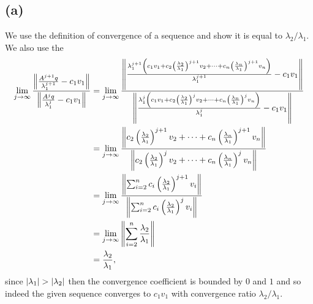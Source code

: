 \documentclass[12pt]{article}
\begin{document}
		\subsection*{(a)}
			We use the definition of convergence of a sequence and show it is equal to $\lambda_2 / \lambda_1$. We also use the 
			\begin{align*}
				\lim_{j \to \infty} \frac{\norm{\frac{A^{j+1}q}{\lambda_{1}^{j+1}} - c_1 v_1}}{\norm{\frac{A^{j}q}{\lambda_{1}^{j}} - c_1 v_1}} &= \lim_{j\to \infty} \frac{\norm{\frac{\lambda_{1}^{j+1} \left(c_1 v_1 + c_2 \left(\frac{\lambda_2}{\lambda_1}\right)^{j+1} v_2 + \dots + c_{n} \left(\frac{\lambda_n}{\lambda_1}\right)^{j+1} v_{n}\right)}{\lambda_{1}^{j+1}}-c_{1}v_{1} }}{{\norm{\frac{\lambda_{1}^{j} \left(c_1 v_1 + c_2 \left(\frac{\lambda_2}{\lambda_1}\right)^{j} v_2 + \dots + c_{n} \left(\frac{\lambda_n}{\lambda_1}\right)^{j} v_{n}\right)}{\lambda_{1}^{j}}-c_{1}v_{1} }}} \\
				&= \lim_{j \to \infty} \frac{\norm{c_2 \left(\frac{\lambda_2}{\lambda_1}\right)^{j+1} v_2 + \dots + c_{n} \left(\frac{\lambda_n}{\lambda_1}\right)^{j+1} v_{n}}}{\norm{c_2 \left(\frac{\lambda_2}{\lambda_1}\right)^{j} v_2 + \dots + c_{n} \left(\frac{\lambda_n}{\lambda_1}\right)^{j} v_{n}}} \\
				&= \lim_{j \to \infty} \frac{\norm{\sum_{i=2}^{n} c_{i}\left(\frac{\lambda_2}{\lambda_1}\right)^{j+1} v_{i}}}{\norm{\sum_{i=2}^{n} c_{i} \left(\frac{\lambda_2}{\lambda_1}\right)^{j} v_{i}}} \\
				&= \lim_{j \to \infty} \norm{\sum_{i=2}^{n} \frac{\lambda_{2}}{\lambda_{1}}} \\
				&= \frac{\lambda_{2}}{\lambda_1},
			\end{align*}
				since $\abs{\lambda_1} > \abs{\lambda_2}$ then the convergence coefficient is bounded by $0$ and $1$ and so indeed the given sequence converges to $c_1 v_1$ with convergence ratio $\lambda_2 / \lambda_1$.
\end{document}
